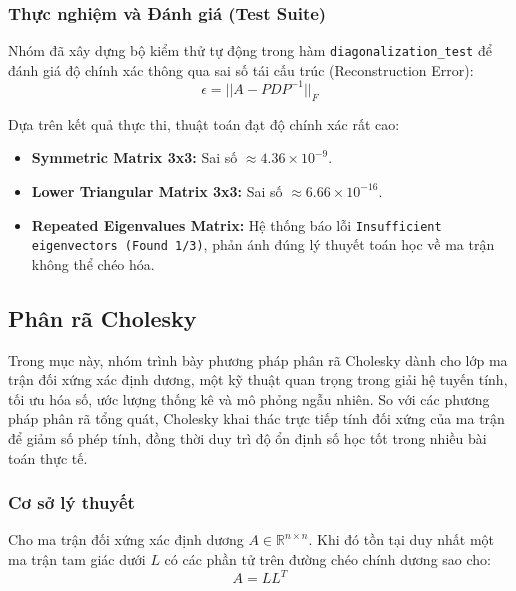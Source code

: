 \documentclass[12pt,a4paper]{article}
\begin{document}
\subsubsection{Thực nghiệm và Đánh giá (Test Suite)}
Nhóm đã xây dựng bộ kiểm thử tự động trong hàm \texttt{diagonalization\_test} để đánh giá độ chính xác thông qua sai số tái cấu trúc (Reconstruction Error):
$$\epsilon = ||A - PDP^{-1}||_F$$

\begin{infobox}
    Dựa trên kết quả thực thi, thuật toán đạt độ chính xác rất cao:
    \begin{itemize}
        \item \textbf{Symmetric Matrix 3x3:} Sai số $\approx 4.36 \times 10^{-9}$.
        \item \textbf{Lower Triangular Matrix 3x3:} Sai số $\approx 6.66 \times 10^{-16}$.
        \item \textbf{Repeated Eigenvalues Matrix:} Hệ thống báo lỗi \texttt{Insufficient eigenvectors (Found 1/3)}, phản ánh đúng lý thuyết toán học về ma trận không thể chéo hóa.
    \end{itemize}
\end{infobox}


\subsection{Phân rã Cholesky}
Trong mục này, nhóm trình bày phương pháp phân rã Cholesky dành cho lớp ma trận đối xứng xác định dương, một kỹ thuật quan trọng trong giải hệ tuyến tính, tối ưu hóa số, ước lượng thống kê và mô phỏng ngẫu nhiên. So với các phương pháp phân rã tổng quát, Cholesky khai thác trực tiếp tính đối xứng của ma trận để giảm số phép tính, đồng thời duy trì độ ổn định số học tốt trong nhiều bài toán thực tế.

\subsubsection{Cơ sở lý thuyết}

\begin{infobox}
Cho ma trận đối xứng xác định dương $A \in \mathbb{R}^{n \times n}$. Khi đó tồn tại duy nhất một ma trận tam giác dưới $L$ có các phần tử trên đường chéo chính dương \cite{ref4,ref5} sao cho:
\begin{equation}
A = L L^T
\end{equation}
\end{infobox}
\end{document}
